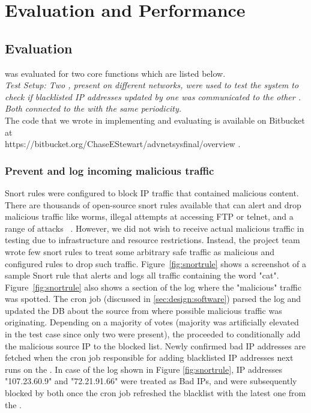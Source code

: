 \section{Evaluation and Performance}
\label{sec:eval}
\subsection{Evaluation}
\sysname was evaluated for two core functions which are listed below.\\
\textit{Test Setup: Two \nodenames, present on different networks, were used to test the system to check if blacklisted IP addresses updated by one \nodename was communicated to the other \nodename. Both \nodenames connected to the \servname with the same periodicity.} \\
The code that we wrote in implementing and evaluating \sysname is available on Bitbucket at \\ https://bitbucket.org/ChaseEStewart/advnetsysfinal/overview \cite{us}.
\subsubsection{Prevent and log incoming malicious traffic}
\label{sec:eval:preventout}

 Snort rules were configured to block IP traffic that contained malicious content. There are thousands of open-source snort rules available that can alert and drop malicious traffic like worms, illegal attempts at accessing FTP or telnet, and a range of attacks ~\cite{Roesch:1999:SLI:1039834.1039864}. However, we did not wish to receive actual malicious traffic in testing due to infrastructure and resource restrictions. Instead, the project team wrote few snort rules to treat some arbitrary safe traffic as malicious and configured rules to drop such traffic. Figure~\ref{fig:snortrule} shows a screenshot of a sample Snort rule that alerts and logs all traffic containing the word "cat". Figure~\ref{fig:snortrule} also shows a section of the log where the "malicious" traffic was spotted. The cron job (discussed in \ref{sec:design:software}) parsed the log and updated the DB about the source from where possible malicious traffic was originating. Depending on a majority of votes (majority was artificially elevated in the test case since only two \nodenames were present), the \servname proceeded to conditionally add the malicious source IP to the blocked list. Newly confirmed bad IP addresses are fetched when the cron job responsible for adding blacklisted IP addresses next runs on the \nodenames. In case of the log shown in Figure \ref{fig:snortrule}, IP addresses "107.23.60.9" and "72.21.91.66" were treated as Bad IPs, and were subsequently blocked by both \nodenames once the cron job refreshed the blacklist with the latest one from the \servname.

